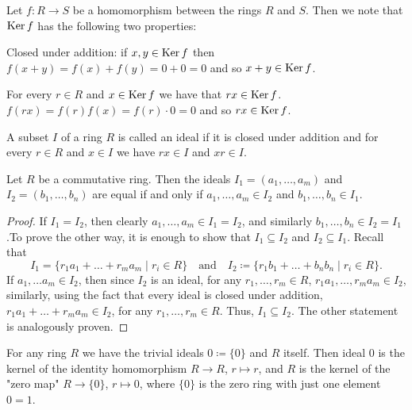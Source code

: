 \documentclass[10pt, a4paper]{article}
\begin{document}
Let $f : R \to S$ be a homomorphism between the rings $R$ and $S$.
Then we note that $\operatorname{Ker}{f}$ has the following two properties:

Closed under addition:
if $x, y \in \operatorname{Ker}{f}$ then $f(x + y) = f(x) + f(y) = 0 + 0 = 0$ and so $x + y \in \operatorname{Ker}{f}$.

For every $r \in R$ and $x \in \operatorname{Ker}{f}$ we have that $rx \in \operatorname{Ker}{f}$.
$f(rx) = f(r)f(x) = f(r)\cdot 0 = 0$ and so $rx \in \operatorname{Ker}{f}$.

\begin{definition}[Ideal]
    A subset $I$ of a ring $R$ is called an ideal if it is closed under addition and for every $r \in R$ and $x \in I$ we have $rx \in I$ and $xr \in I$.
\end{definition}

\begin{lemma}
    Let $R$ be a commutative ring.
    Then the ideals $I_1 = (a_1, \dotsc, a_m)$ and $I_2 = (b_1, \dotsc, b_n)$ are equal if and only if $a_1, \dotsc, a_m \in I_2$ and $b_1, \dotsc, b_n \in I_1$.

    \begin{proof}
        If $I_1 = I_2$,
        then clearly $a_1, \dotsc, a_m \in I_1 = I_2$,
        and similarly $b_1, \dotsc, b_n \in I_2 = I_1$.To prove the other way,
        it is enough to show that $I_1 \subseteq I_2$ and $I_2 \subseteq I_1$.
        Recall that
        \[
        I_1 = \{r_1a_1 + \dotsc + r_ma_m \mid r_i \in R\}\quad\text{and}\quad I_2 \coloneqq \{r_1b_1 + \dotsc + b_nb_n\mid r_i \in R\}.
        \]
        If $a_1, \dotsc a_m \in I_2$,
        then since $I_2$ is an ideal,
        for any $r_1, \dotsc, r_m \in R$,
        $r_1a_1, \dotsc, r_ma_m \in I_2$,
        similarly,
        using the fact that every ideal is closed under addition,
        $r_1a_1 + \dotsc + r_ma_m \in I_2$,
        for any $r_1, \dotsc, r_m \in R$.
        Thus,
        $I_1 \subseteq I_2$.
        The other statement is analogously proven.
    \end{proof}
\end{lemma}

\begin{example}
    For any ring $R$ we have the trivial ideals $0 \coloneqq \{0\}$ and $R$ itself.
    Then ideal $0$ is the kernel of the identity homomorphism $R \to R$,
    $r \mapsto r$,
    and $R$ is the kernel of the
    "zero map"
    $R \to \{0\}$,
    $r \mapsto 0$,
    where $\{0\}$ is the zero ring with just one element $0 = 1$.
\end{example}
\end{document}
